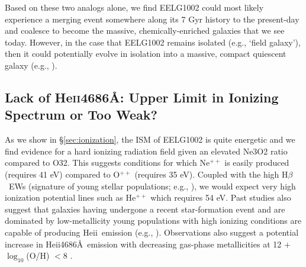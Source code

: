 \documentclass[twocolumn,tight,times,linenumbers]{aastex631}
\newcommand{\hbeta}{H$\beta$}
\newcommand{\heii}{He{\sc ii}}
\newcommand{\zzz}{{\color{red} ZZZ}}
\begin{document}
		Based on these two analogs alone, we find EELG1002 could most likely experience a merging event somewhere along its 7 Gyr history to the present-day and coalesce to become the massive, chemically-enriched galaxies that we see today. However, in the case that EELG1002 remains isolated (e.g., `field galaxy'), then it could potentially evolve in isolation into a massive, compact quiescent galaxy (e.g., \citealt{Barro2013,Zolotov2015}).%
		
		
		\subsection{Lack of He\textsc{ii}4686\AA: Upper Limit in Ionizing Spectrum or Too Weak?}
		
		As we show in \S\ref{sec:ionization}, the ISM of EELG1002 is quite energetic and we find evidence for a hard ionizing radiation field given an elevated Ne3O2 ratio compared to O32. This suggests conditions for which Ne$^{++}$ is easily produced (requires 41 eV) compared to O$^{++}$ (requires 35 eV).  Coupled with the high \hbeta~EWs (signature of young stellar populations; e.g., \citealt{Fernandes2003,Levesque2013}), we would expect very high ionization potential lines such as He$^{++}$ which requires 54 eV. Past studies also suggest that galaxies having undergone a recent star-formation event and are dominated by low-metallicity young populations with high ionizing conditions are capable of producing \heii~emission (e.g., \citealt{Schaerer2003,Saxena2020,Berg2021}). Observations also suggest a potential increase in \heii4686\AA~emission with decreasing gas-phase metallicities at 12 + $\log_{10}$(O/H) $ < 8$ \citep{Senchyna2019}. 
		
\end{document}
